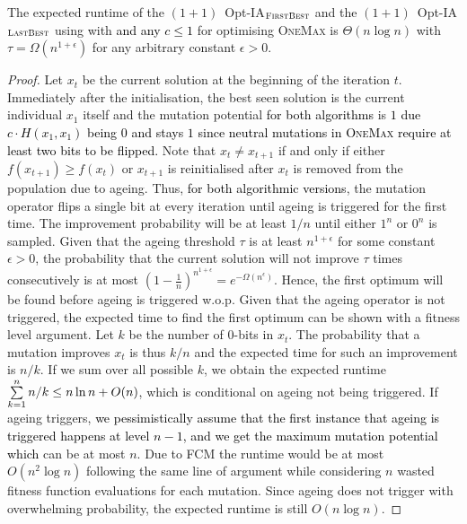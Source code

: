 \documentclass[lettersize,journal]{IEEEtran}
\newcommand{\new}[1]{\textcolor{black}{#1}}
\begin{document}
\begin{theorem} \label{thm:onemaxexpo}
The expected runtime of the $(1+1)$~Opt-IA$_{\textsc{FirstBest}}$ and the $(1+1)$~Opt-IA$_{\textsc{LastBest}}$ using \IPHfcm{}  %
with {\linHD } \new{and any $c\leq 1$} for optimising
\textsc{OneMax} is $\Theta(n\log n)$ with $\tau=\Omega(n^{1+\epsilon})$ for any arbitrary constant $\epsilon>0$.
\end{theorem}
\begin{proof}
Let $x_t$ be the current solution at the beginning of the iteration $t$. Immediately after the initialisation, the best seen solution is the current individual $x_1$ itself and the mutation potential \new{for both algorithms} is %
\textcolor{black}{$1$ due $c\cdot H(x_1,x_1)$ being $0$ and stays $1$ since neutral mutations in \textsc{OneMax} require at least two bits to be flipped.} Note that  $x_t \neq x_{t+1}$ if and only if either $f(x_{t+1})\geq f(x_t)$ or $x_{t+1}$ is reinitialised after $x_t$ is removed from the population due to ageing. Thus, \new{for both algorithmic versions}, the mutation operator flips a single bit at every iteration until ageing is triggered for the first time.
The improvement probability will be at least $ 1/n $ until either $1^n$ or $0^n$ is sampled. 
Given that the ageing threshold $\tau$  is at least $n^{1+\epsilon}$ for some constant $\epsilon >0 $, 
the probability that the current solution will not improve $\tau$ times consecutively is at most 
$(1-\frac{1}{n})^{n^{1+\epsilon}}=e^{-\Omega(n^\epsilon)}$. 
Hence, the first optimum will be found before ageing is triggered w.o.p. Given that the ageing operator is not triggered, the expected time to find the first optimum can be shown with a fitness level argument. Let $k$ be the number of $0$-bits in $x_t$. The probability that a mutation improves $x_t$ is thus $k/n$ and the expected time for such an improvement is $n/k$. If we sum over all possible $k$, we obtain the expected runtime $\sum\limits_{k=1}^{n}n/k \leq n \ln n + {\color{black}O(n) } $, which is conditional on ageing not being triggered. If ageing triggers, \new{we pessimistically assume that the first instance that ageing is triggered happens at level $n-1$, and we get the maximum mutation potential which} can be at most $n$. Due to FCM the runtime would be at most $O(n^2 \log n)$ following the same line of argument while considering $n$ wasted fitness function evaluations for each mutation. %
Since ageing does not trigger with overwhelming probability, the expected runtime is still $O(n \log{n})$.


\end{proof}
\end{document}
